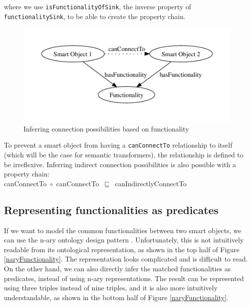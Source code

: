 \noindent
where we use \texttt{isFunctionalityOfSink}, the inverse property of \texttt{func\-tion\-al\-i\-ty\-Sink}, to be able to create the property chain.

\begin{figure}[bth]
        \includegraphics[width=\linewidth]{canConnectTo}
        \caption{Inferring connection possibilities based on functionality}
        \label{canConnectTo}
\end{figure}

To prevent a smart object from having a \texttt{canConnectTo} relationship to itself (which will be the case for semantic transformers), the relationship is defined to be irreflexive. Inferring indirect connection possibilities is also possible with a property chain:\\

\noindent
canConnectTo~\ensuremath{\circ}~canConnectTo~\ensuremath{\sqsubseteq}~canIndirectlyConnectTo



\subsection{Representing functionalities as predicates}
\label{predicateFunctionality}
If we want to model the common functionalities between two smart objects, we can use the n-ary ontology design pattern \cite{Noy2006}. Unfortunately, this is not intuitively readable from its ontological representation, as shown in the top half of Figure \ref{naryFunctionality}. The representation looks complicated and is difficult to read. On the other hand, we can also directly infer the matched functionalities as predicates, instead of using n-ary representations. The result can be represented using three triples instead of nine triples, and it is also more intuitively understandable, as shown in the bottom half of Figure \ref{naryFunctionality}.

